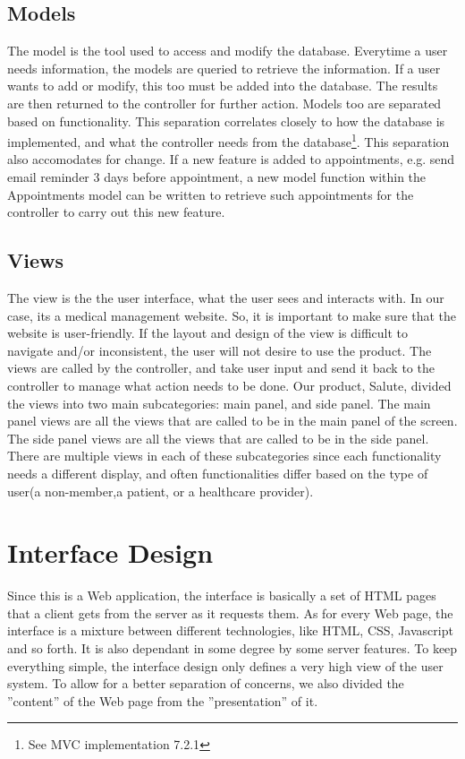 \documentclass[12pt]{report}
\begin{document}
\subsection{Models}
The model is the tool used to access and modify the database. Everytime a user needs information, the models are queried to retrieve the information. If a user wants to add or modify, this too must be added into the database. The results are then returned to the controller for further action.
Models too are separated based on functionality. This separation correlates closely to how the database is implemented, and what the controller needs from the database\footnote{See MVC implementation 7.2.1}. This separation also accomodates for change. If a new feature is added to appointments, e.g. send email reminder 3 days before appointment, a new model function within the Appointments model can be written to retrieve such appointments for the controller to carry out this new feature. 

\subsection{Views}
The view is the the user interface, what the user sees and interacts with. In our case, its a medical management website. So, it is important to make sure that the website is user-friendly. If the layout and design of the view is difficult to navigate and/or inconsistent, the user will not desire to use the product. The views are called by the controller, and take user input and send it back to the controller to manage what action needs to be done. 
Our product, Salute, divided the views into two main subcategories: main panel, and side panel. The main panel views are all the views that are called to be in the main panel of the screen. The side panel views are all the views that are called to be in the side panel. There are multiple views in each of these subcategories since each functionality needs a different display, and often functionalities differ based on the type of user(a non-member,a patient, or a healthcare provider). 

\section{Interface Design}
Since this is a Web application, the interface is basically a set of HTML pages that a client gets from the server as it requests them. As for every Web page, the interface is a mixture between different technologies, like HTML, CSS, Javascript and so forth. It is also dependant in some degree by some server features. To keep everything simple, the interface design only defines a very high view of the user system. To allow for a better separation of concerns, we also divided the ''content'' of the Web page from the ''presentation'' of it.
\end{document}

